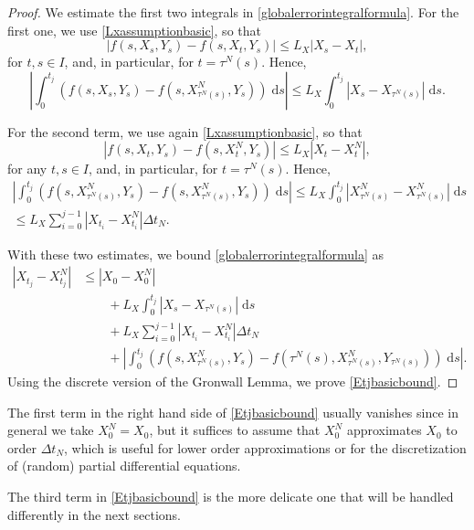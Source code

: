 \documentclass[reqno,12pt]{amsart}
\theoremstyle{plain}%
\theoremstyle{definition}
\begin{document}
\begin{proof}
    We estimate the first two integrals in \eqref{globalerrorintegralformula}. For the first one, we use \eqref{Lxassumptionbasic}, so that
    $$
        |f(s, X_s, Y_s) - f(s, X_t, Y_s)| \leq L_X |X_s - X_t|,
    $$
    for $t, s \in I$, and, in particular, for $t = \tau^N(s)$. Hence,
    $$
        \left|\int_0^{t_j} \left( f(s, X_s, Y_s) - f(s, X_{\tau^N(s)}^N, Y_s) \right)\;\mathrm{d}s \right| \leq L_X \int_0^{t_j} |X_s - X_{\tau^N(s)}| \;\mathrm{d}s.
    $$
    
    For the second term, we use again \eqref{Lxassumptionbasic}, so that
    $$
        |f(s, X_t, Y_s) - f(s, X_t^N, Y_s)| \leq L_X |X_t - X_t^N|,
    $$
    for any $t, s \in I$, and, in particular, for $t = \tau^N(s)$. Hence,
    \begin{multline*}
        \left|\int_0^{t_j} \left( f(s, X_{\tau^N(s)}^N, Y_s) - f(s, X_{\tau^N(s)}^N, Y_s) \right)\;\mathrm{d}s \right| \leq L_X \int_0^{t_j} |X_{\tau^N(s)}^N - X_{\tau^N(s)}^N| \;\mathrm{d}s \\
        \leq L_X\sum_{i=0}^{j-1} |X_{t_i} - X_{t_i}^N|\Delta t_N.
    \end{multline*}
    
    With these two estimates, we bound \eqref{globalerrorintegralformula} as
    \begin{align*}
        |X_{t_j} - X_{t_j}^N| & \leq |X_0 - X_0^N| \\
        & \qquad + L_X \int_0^{t_j} |X_s - X_{\tau^N(s)}| \;\mathrm{d}s  \\ 
        & \qquad + L_X\sum_{i=0}^{j-1} |X_{t_i} - X_{t_i}^N|\Delta t_N \\
        & \qquad + \left|\int_0^{t_j} \left( f(s, X_{\tau^N(s)}^N, Y_s) - f(\tau^N(s), X_{\tau^N(s)}^N, Y_{\tau^N(s)}) \right)\;\mathrm{d}s\right|.
    \end{align*}
    Using the discrete version of the Gronwall Lemma, we prove \eqref{Etjbasicbound}.
\end{proof}

The first term in the right hand side of \eqref{Etjbasicbound} usually vanishes since in general we take $X_0^N = X_0$, but it suffices to assume that $X_0^N$ approximates $X_0$ to order $\Delta t_N$, which is useful for lower order approximations or for the discretization of (random) partial differential equations.

The third term in \eqref{Etjbasicbound} is the more delicate one that will be handled differently in the next sections.
\end{document}

